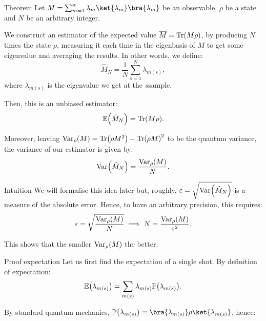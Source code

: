 \documentclass[a4paper]{article}
\begin{document}
\begin{parag}{Theorem}
    Let $M = \sum_{m=1}^{\alpha} \lambda_m \ket{\lambda_m}\bra{\lambda_m}$ be an observable, $\rho$ be a state and $N$ be an arbitrary integer. 

    We construct an estimator of the expected value $\bar{M} = \Tr\left(M \rho\right)$, by producing $N$ times the state $\rho$, measuring it each time in the eigenbasis of $M$ to get some eigenvalue and averaging the results. In other words, we define:
    \[\hat{M}_N = \frac{1}{N}\sum_{s=1}^{N} \lambda_{m\left(s\right)},\]
    where $\lambda_{m\left(s\right)}$ is the eigenvalue we get at the $s$\Th sample.
    
    Then, this is an unbiased estimator:
    \[\exval\left(\hat{M}_N\right) = \Tr\left(M \rho\right).\]
    
    Moreover, leaving $\Var_{\rho}\left(M\right) = \Tr\left(\rho M^2\right) - \Tr\left(\rho M\right)^2$ to be the quantum variance, the variance of our estimator is given by:
    \[\Var\left(\hat{M}_N\right) = \frac{\Var_{\rho}\left(M\right)}{N}.\]
    
    \begin{subparag}{Intuition}
        We will formalise this idea later but, roughly, $\epsilon = \sqrt{\Var\left(\hat{M}_N\right)}$ is a measure of the absolute error. Hence, to have an arbitrary precision, this requires: 
        \[\epsilon = \sqrt{\frac{\Var_{\rho}\left(M\right)}{N}} \implies N = \frac{\Var_{\rho}\left(M\right)}{\epsilon^2}.\]

        This shows that the smaller $\Var_{\rho}\left(M\right)$ the better.
    \end{subparag}

    \begin{subparag}{Proof expectation}
        Let us first find the expectation of a single shot. By definition of expectation:
        \[\exval\left(\lambda_{m\left(s\right)}\right) = \sum_{m\left(s\right)} \lambda_{m\left(s\right)}\prob\left(\lambda_{m\left(s\right)}\right).\]

        By standard quantum mechanics, $\prob\left(\lambda_{m\left(s\right)}\right) = \bra{\lambda_{m\left(s\right)}} \rho \ket{\lambda_{m\left(s\right)}}$, hence: 


\end{subparag}
\end{parag}
\end{document}
